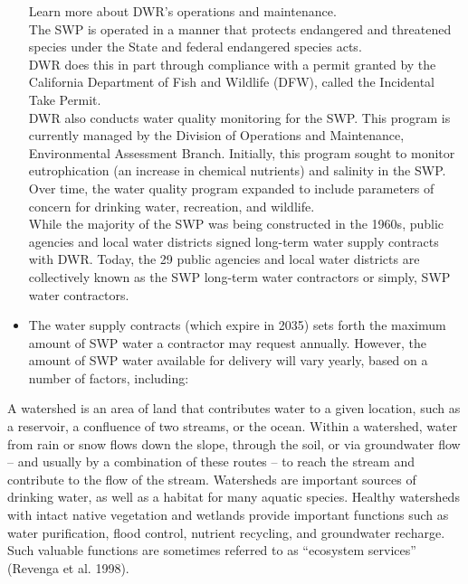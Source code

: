 \documentclass{article}
\begin{document}
\begin{itemize}
Learn more about DWR's operations and maintenance.\\

The SWP is operated in a manner that protects endangered and threatened species under the State and federal endangered species acts.\\

DWR does this in part through compliance with a permit granted by the California Department of Fish and Wildlife (DFW), called the Incidental Take Permit.\\

DWR also conducts water quality monitoring for the SWP. This program is currently managed by the Division of Operations and Maintenance,  Environmental Assessment Branch. Initially, this program sought to monitor eutrophication (an increase in chemical nutrients) and salinity in the SWP. Over time, the water quality program expanded to include parameters of concern for drinking water, recreation, and wildlife.\\

While the majority of the SWP was being constructed in the 1960s, public agencies and local water districts signed long-term water supply contracts with DWR. Today, the 29 public agencies and local water districts are collectively known as the SWP long-term water contractors or simply, SWP water contractors.\\

\item The water supply contracts (which expire in 2035) sets forth the maximum amount of SWP water a contractor may request annually.
However, the amount of SWP water available for delivery will vary yearly, based on a number of factors, including:\\
\end{itemize}
A watershed is an area of land that contributes water to a given location, such as a reservoir, a
confluence of two streams, or the ocean. Within a watershed, water from rain or snow flows
down the slope, through the soil, or via groundwater flow – and usually by a combination of
these routes – to reach the stream and contribute to the flow of the stream. Watersheds are
important sources of drinking water, as well as a habitat for many aquatic species. Healthy
watersheds with intact native vegetation and wetlands provide important functions such as
water purification, flood control, nutrient recycling, and groundwater recharge. Such valuable
functions are sometimes referred to as “ecosystem services” (Revenga et al. 1998).\\
\end{document}
